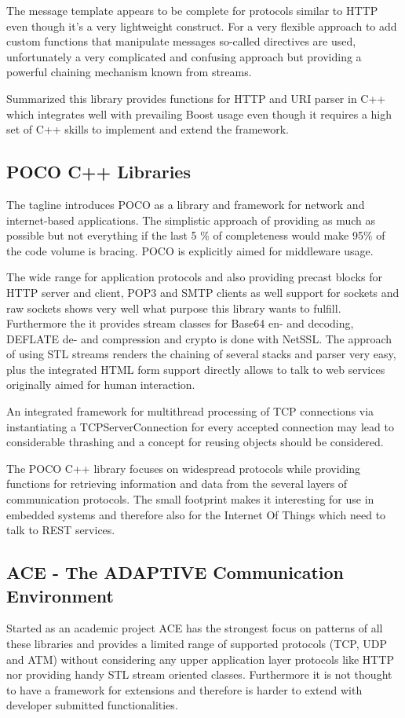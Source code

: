 \documentclass[twocolumn,english]{IEEEtran}
\theoremstyle{plain}
\theoremstyle{plain}
\begin{document}
The message template\cite{cpp-netlib-message} appears to be complete for
protocols similar to HTTP even though it's a very lightweight construct. For a
very flexible approach to add custom functions that manipulate messages
so-called directives are used, unfortunately a very complicated and confusing
approach but providing a powerful chaining mechanism known from
streams\cite{cpp-netlib-directives}.

Summarized this library provides functions for HTTP and URI parser in C++
which integrates well with prevailing Boost usage even though it requires a
high set of C++ skills to implement and extend the framework.

\subsection{POCO C++ Libraries\cite{poco}}
The tagline introduces POCO as a library and framework for network and
internet-based applications. The simplistic approach of providing as much as
possible but not everything if the last 5 \% of completeness would make 95\%
of the code volume is bracing. POCO is explicitly aimed for middleware usage.

The wide range for application protocols\cite{poco-network} and also providing
precast blocks for HTTP server and client, POP3 and SMTP clients as well
support for sockets and raw sockets shows very well what purpose this library
wants to fulfill.  Furthermore the it provides stream classes for Base64 en-
and decoding, DEFLATE de- and compression and crypto is done with NetSSL. The
approach of using STL streams renders the chaining of several stacks and
parser very easy, plus the integrated HTML form support directly allows to
talk to web services originally aimed for human interaction.

An integrated framework for multithread processing of TCP connections via
instantiating a TCPServerConnection for every accepted connection may lead to
considerable thrashing and a concept for reusing objects should be considered.

The POCO C++ library focuses on widespread protocols while providing functions
for retrieving information and data from the several layers of communication
protocols. The small footprint makes it interesting for use in embedded
systems and therefore also for the Internet Of Things which need to talk to
REST services.

\subsection{ACE - The ADAPTIVE Communication Environment\cite{ace}}
Started as an academic project ACE has the strongest focus on patterns of all
these libraries and provides a limited range of supported protocols (TCP, UDP
and ATM) without considering any upper application layer protocols like HTTP
nor providing handy STL stream oriented classes. Furthermore it is not thought
to have a framework for extensions and therefore is harder to extend with
developer submitted functionalities.
\end{document}

